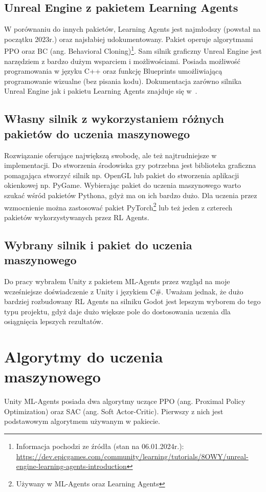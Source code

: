 \documentclass{SGGW-thesis}
\begin{document}
\subsection{Unreal Engine z pakietem Learning Agents}
W porównaniu do innych pakietów, Learning Agents jest najmłodszy (powstał na początku 2023r.) oraz najsłabiej udokumentowany. Pakiet operuje algorytmami PPO oraz BC (ang. Behavioral Cloning)\footnote{Informacja pochodzi ze źródła (stan na 06.01.2024r.): \url{https://dev.epicgames.com/community/learning/tutorials/8OWY/unreal-engine-learning-agents-introduction}}. 
Sam silnik graficzny Unreal Engine jest narzędziem z bardzo dużym wsparciem i możliwościami. Posiada możliwość programowania w języku C++ oraz funkcję Blueprints umożliwiającą programowanie wizualne (bez pisania kodu). 
Dokumentacja zarówno silnika Unreal Engine jak i pakietu Learning Agents znajduje się w~\cite{UnrealDocs}.
\subsection{Własny silnik z wykorzystaniem różnych pakietów do uczenia maszynowego}
Rozwiązanie oferujące największą swobodę, ale też najtrudniejsze w implementacji. Do stworzenia środowiska gry potrzebna jest biblioteka graficzna pomagająca stworzyć silnik np. OpenGL
lub pakiet do stworzenia aplikacji okienkowej np. PyGame. Wybierając pakiet do uczenia maszynowego warto szukać wśród pakietów Pythona, gdyż ma on ich bardzo dużo. Dla uczenia przez wzmocnienie można zastosować pakiet PyTorch\footnote{Używany w ML-Agents oraz Learning Agents}
lub też jeden z czterech pakietów wykorzystywanych przez RL Agents.
\subsection*{Wybrany silnik i pakiet do uczenia maszynowego}
Do pracy wybrałem Unity z pakietem ML-Agents przez wzgląd na moje wcześniejsze doświadczenie z Unity i językiem C\#. Uważam jednak, że dużo bardziej rozbudowany RL Agents na silniku Godot jest lepszym wyborem do tego typu projektu, gdyż daje dużo większe pole do dostosowania uczenia dla osiągnięcia lepszych rezultatów.

\pagebreak
\section{Algorytmy do uczenia maszynowego}
\label{algorithms}
Unity ML-Agents posiada dwa algorytmy uczące PPO (ang. Proximal Policy Optimization) oraz SAC (ang. Soft Actor-Critic). Pierwszy z nich jest podstawowym algorytmem używanym w pakiecie.
\end{document}
